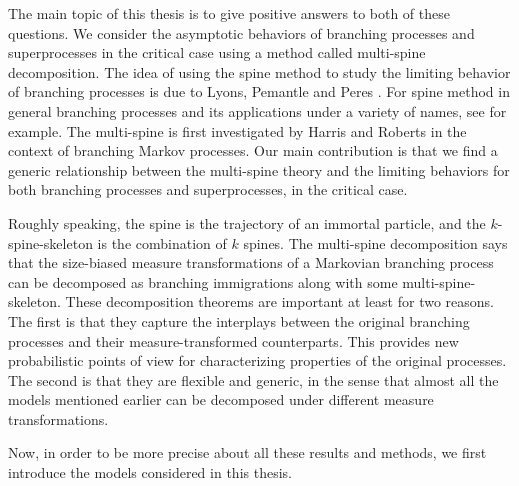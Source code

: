 \documentclass[UTF8]{pkuthss}
\theoremstyle{plain}
\theoremstyle{definition}
\numberwithin{equation}{section}
\begin{document}
    The main topic of this thesis is to give positive answers to both of these questions. 
    We consider the asymptotic behaviors of branching processes and superprocesses in the critical case using a method called multi-spine decomposition. 
    The idea of using the spine method to study the limiting behavior of branching processes is due to Lyons, Pemantle and Peres \cite{LyonsPemantlePeres1995Conceptual}. 
    For spine method in general branching processes and its applications under a variety of names, see \cite{Aidekon2013Convergence,AidekonShi2014SenetaHeyde,BigginsKyprianou2004Measure,ChauvinRouault1988KPP,Englander2009Law,EnglanderHarrisKyprianou2010Strong,EnglanderKyprianou2004Local,GeorgiiBaake2003Supercritical,HuShi2009Minimal,Lambert2007Quasistationary,LiuRenSong2009Log,RenYang2014Multitype} for example.
    The multi-spine is first investigated by Harris and Roberts \cite{HarrisRoberts2017Manytofew} in the context of branching Markov processes. 
    Our main contribution is that we find a generic relationship between the multi-spine theory and the limiting behaviors for both branching processes and superprocesses, in the critical case.


    Roughly speaking, the spine is the trajectory of an immortal particle, and the $k$-spine-skeleton is the combination of $k$ spines.
    The multi-spine decomposition says that the size-biased measure transformations of a Markovian branching process can be decomposed as branching immigrations along with some multi-spine-skeleton.
    These decomposition theorems are important at least for two reasons. 
    The first is that they capture the interplays between the original branching processes and their measure-transformed counterparts. 
    This provides new probabilistic points of view for characterizing properties of the original processes.
    The second is that they are flexible and generic, in the sense that almost all the models mentioned earlier can be decomposed under different measure transformations. 

    Now, in order to be more precise about all these results and methods, we first introduce the models considered in this thesis.
\end{document}
